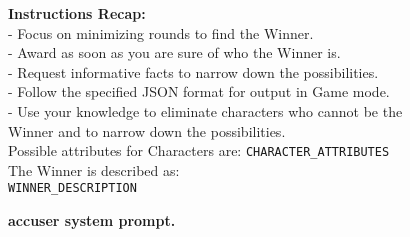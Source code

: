 \begin{figure*}[!ht]
\begin{tcolorbox}[colback=gray!10,arc=0pt,outer arc=0pt,boxrule=0pt,toprule=0.5mm,bottomrule=0.5mm,rightrule=0.5mm,leftrule=0.5mm]
\begin{minipage}{\linewidth}
\begin{tcolorbox}[colback=blue!5,
            colframe=blue!50,arc=0pt,outer arc=0pt,boxrule=0pt,toprule=0.5mm,bottomrule=0.5mm,rightrule=0.5mm,leftrule=0.5mm, title=Accuser System Prompt,coltitle=black]
                \textbf{Instructions Recap:} \\
                - Focus on minimizing rounds to find the Winner. \\
                - Award as soon as you are sure of who the Winner is. \\
                - Request informative facts to narrow down the possibilities. \\
                - Follow the specified JSON format for output in Game mode. \\
                - Use your knowledge to eliminate characters who cannot be the Winner and to narrow down the possibilities. \\

                Possible attributes for Characters are: \texttt{CHARACTER\_ATTRIBUTES} \\

                The Winner is described as: \\
                \texttt{WINNER\_DESCRIPTION}
            \end{tcolorbox} %
        \end{minipage}
    \end{tcolorbox}
    \caption{\textbf{
    \ourenvasym{} accuser system prompt.}}
    \label{fig:asym_sysprompts}
\end{figure*}

